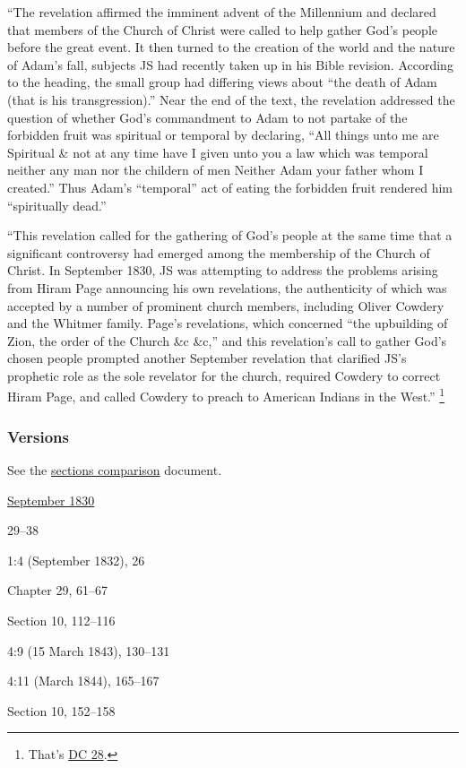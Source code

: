 			``The revelation affirmed the imminent advent of the Millennium and declared that members of the Church of Christ were called to help gather God's people before the great event. It then turned to the creation of the world and the nature of Adam's fall, subjects JS had recently taken up in his Bible revision. According to the heading, the small group had differing views about ``the death of Adam (that is his transgression).'' Near the end of the text, the revelation addressed the question of whether God's commandment to Adam to not partake of the forbidden fruit was spiritual or temporal by declaring, ``All things unto me are Spiritual \& not at any time have I given unto you a law which was temporal neither any man nor the childern of men Neither Adam your father whom I created.'' Thus Adam's ``temporal'' act of eating the forbidden fruit rendered him ``spiritually dead.''
			
			``This revelation called for the gathering of God's people at the same time that a significant controversy had emerged among the membership of the Church of Christ. In September 1830, JS was attempting to address the problems arising from Hiram Page announcing his own revelations, the authenticity of which was accepted by a number of prominent church members, including Oliver Cowdery and the Whitmer family. Page's revelations, which concerned ``the upbuilding of Zion, the order of the Church \&c \&c,'' and this revelation's call to gather God's chosen people prompted another September revelation that clarified JS's prophetic role as the sole revelator for the church, required Cowdery to correct Hiram Page, and called Cowdery to preach to American Indians in the West.''%
				\footnote{%
					That's \hyperref[DC28]{DC 28}.
					}
			
	\subsubsection{Versions}
		\label{DC29-V}
		
		See the \href{https://drive.google.com/file/d/1goAvNz8jS4R8slYfMG_db55Ty2z_vmgK/view?usp=sharing}{sections comparison} document.
	
		\begin{compactdesc}
			\item[JSP] \hyperref[EMS-1830-JS-SEP-1830-A]{September 1830}
			\item[{\hyperref[HSN]{HSN}}\footnotemark] 29--38
			\item[EMS] 1:4 (September 1832), 26
			\item[BC] Chapter 29, 61--67
			\item[DC 1835] Section 10, 112--116
			\item[TS] 4:9 (15 March 1843), 130--131
			\item[MS] 4:11 (March 1844), 165--167
			\item[DC 1844] Section 10, 152--158
		\end{compactdesc}

